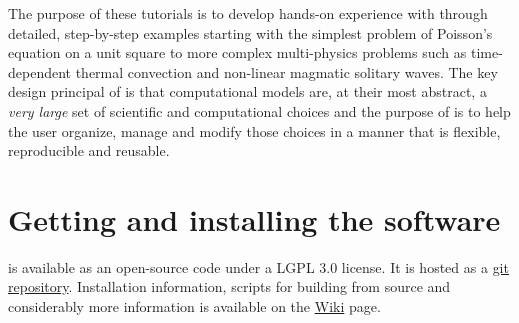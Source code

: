 The purpose of these tutorials is to develop hands-on experience with
\TF{} through detailed, step-by-step examples starting with the
simplest problem of Poisson's equation on a unit square to more
complex multi-physics problems such as time-dependent thermal
convection and non-linear magmatic solitary waves.  The key design
principal of \TF{} is that computational models are, at their most
abstract, a \emph{very large} set of scientific and computational
choices and the purpose of \TF{} is to help the user organize, manage
and modify those choices in a manner that is flexible, reproducible
and reusable.

\section{Getting and installing the \TF{} software}
\label{sec:gett-inst-tf}

\TF{} is available as an open-source code under a LGPL 3.0
license.  It is hosted as a
\href{https://github.com/terraferma/terraferma}{git repository}.
Installation information, scripts for building from source and
considerably more information is available on the
\href{https://terraferma.github.io}{Wiki} page. 


